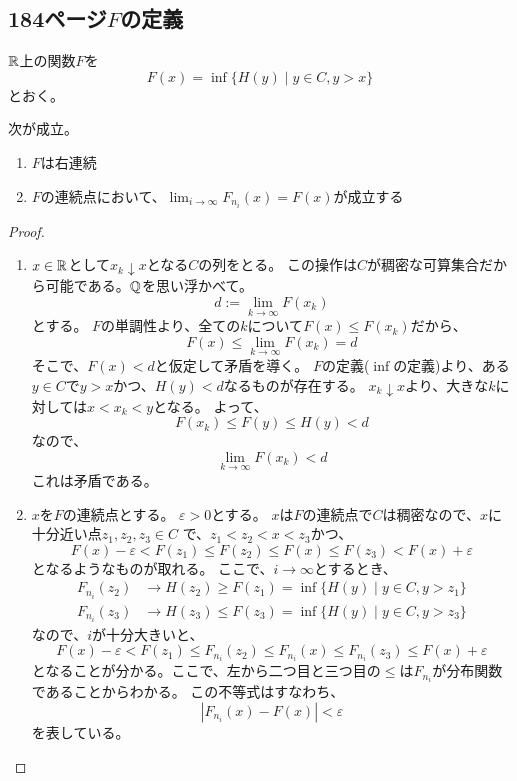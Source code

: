   \subsection{184ページ$F$の定義}
    ${\mathbb{R}}$上の関数$F$を
    \[
      F(x) = \inf \{H(y) \mid y \in C, y > x \}
    \]
    とおく。
    \begin{prop*}
      次が成立。
      \begin{enumerate}
        \item $F$は右連続
        \item $F$の連続点において、$\lim_{i \to \infty}F_{n_i}(x) = F(x)$が成立する
      \end{enumerate}
    \end{prop*}
    \begin{proof}
      \begin{enumerate}
        \item $x \in {\mathbb{R}}$として$x_k \downarrow x$となる$C$の列をとる。
        この操作は$C$が稠密な可算集合だから可能である。${\mathbb{Q}}$を思い浮かべて。
        \[
          d := \lim_{k \to \infty}F(x_k)
        \]
        とする。
        $F$の単調性より、全ての$k$について$F(x) \leq F(x_k)$だから、
        \[
          F(x) \leq \lim_{k \to \infty}F(x_k) =d
        \]
        そこで、$F(x) < d$と仮定して矛盾を導く。
        $F$の定義($\inf$の定義)より、ある$y \in C$で$y > x$かつ、$H(y) < d$なるものが存在する。
        $x_k \downarrow x$より、大きな$k$に対しては$x < x_k < y$となる。
        よって、
        \[
          F(x_k) \leq F(y) \leq H(y) < d
        \]
        なので、
        \[
          \lim_{k \to \infty}F(x_k) < d
        \]
        これは矛盾である。
        \item $x$を$F$の連続点とする。
        $\varepsilon > 0$とする。
        $x$は$F$の連続点で$C$は稠密なので、$x$に十分近い点$z_1,z_2,z_3 \in C$
        で、$z_1< z_2 < x < z_3$かつ、
        \[
          F(x) - \varepsilon < F(z_1) \leq F(z_2) \leq F(x) \leq F(z_3) <F(x) + \varepsilon
        \]
        となるようなものが取れる。
        ここで、$i \longrightarrow \infty$とするとき、
        \begin{align*}
          F_{n_i}(z_2) &\longrightarrow H(z_2) \ge F(z_1) = \inf\{H(y) \mid y \in C ,y > z_1 \}\\
          F_{n_i}(z_3) &\longrightarrow H(z_3) \leq F(z_3) = \inf\{H(y) \mid y \in C ,y > z_3 \}
        \end{align*}
        なので、$i$が十分大きいと、
        \[
          F(x) - \varepsilon < F(z_1) \leq F_{n_i}(z_2) \leq F_{n_i}(x) \leq F_{n_i}(z_3) \leq F(x) + \varepsilon
        \]
        となることが分かる。ここで、左から二つ目と三つ目の$\leq$は$F_{n_i}$が分布関数であることからわかる。
        この不等式はすなわち、
        \[
          |F_{n_i}(x) - F(x)| < \varepsilon
        \]
        を表している。
      \end{enumerate}
    \end{proof}

